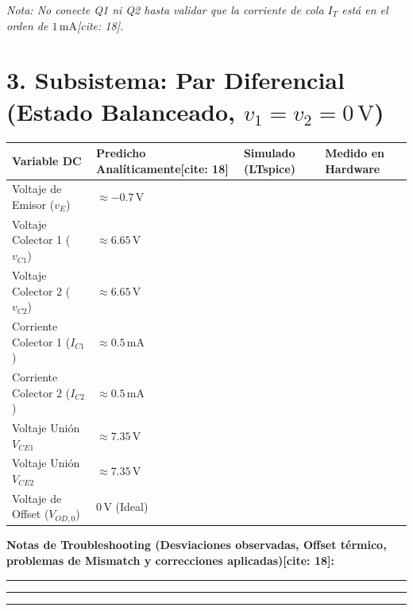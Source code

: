 \documentclass[11pt, a4paper]{article}
\begin{document}
\vspace{0.3cm}
\textit{Nota: No conecte Q1 ni Q2 hasta validar que la corriente de cola $I_T$ está en el orden de $1\,\text{mA}$[cite: 18].}

\section*{3. Subsistema: Par Diferencial (Estado Balanceado, $v_1=v_2=0\,\text{V}$)}
\begin{tabularx}{\textwidth}{|>{\raggedright\arraybackslash}p{4.5cm}|>{\centering\arraybackslash}X|>{\centering\arraybackslash}X|>{\centering\arraybackslash}X|}
\hline
\rowcolor{ucbblue!20}
\textbf{Variable DC} & \textbf{Predicho Analíticamente[cite: 18]} & \textbf{Simulado (LTspice)} & \textbf{Medido en Hardware} \\ \hline
Voltaje de Emisor ($v_E$) & $\approx -0.7\,\text{V}$ & & \\ \hline
Voltaje Colector 1 ($v_{C1}$) & $\approx 6.65\,\text{V}$ & & \\ \hline
Voltaje Colector 2 ($v_{C2}$) & $\approx 6.65\,\text{V}$ & & \\ \hline
Corriente Colector 1 ($I_{C1}$) & $\approx 0.5\,\text{mA}$ & & \\ \hline
Corriente Colector 2 ($I_{C2}$) & $\approx 0.5\,\text{mA}$ & & \\ \hline
Voltaje Unión $V_{CE1}$ & $\approx 7.35\,\text{V}$ & & \\ \hline
Voltaje Unión $V_{CE2}$ & $\approx 7.35\,\text{V}$ & & \\ \hline
Voltaje de Offset ($V_{OD,0}$) & $0\,\text{V}$ (Ideal) & & \\ \hline
\end{tabularx}

\vspace{0.6cm}
\textbf{Notas de Troubleshooting (Desviaciones observadas, Offset térmico, problemas de Mismatch y correcciones aplicadas)[cite: 18]:}
\vspace{0.3cm}
\hrule\vspace{0.7cm}
\hrule\vspace{0.7cm}
\hrule
\end{document}
